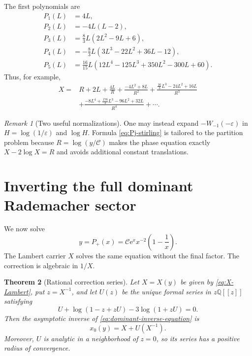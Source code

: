 \documentclass[11pt,a4paper]{article}
\numberwithin{equation}{section}
\newtheorem{theorem}{Theorem}[section]
\theoremstyle{remark}
\newtheorem{remark}[theorem]{Remark}
\newcommand{\e}{\mathrm e}
\newcommand{\QQ}{\mathbb Q}
\newcommand{\Ccal}{\mathcal C}
\begin{document}
The first polynomials are
\begin{align}
 P_1(L)&=4L,\nonumber\\
 P_2(L)&=-4L(L-2),\nonumber\\
 P_3(L)&=\frac83L(2L^2-9L+6),\label{eq:P-first}\\
 P_4(L)&=-\frac83L(3L^3-22L^2+36L-12),\nonumber\\
 P_5(L)&=\frac{16}{15}L(12L^4-125L^3+350L^2-300L+60).\nonumber
\end{align}
Thus, for example,
\begin{align}\label{eq:X-explicit-five}
 X={}&R+2L+\frac{4L}{R}
 +\frac{-4L^2+8L}{R^2}
 +\frac{\frac{16}{3}L^3-24L^2+16L}{R^3}\\
 &+\frac{-8L^4+\frac{176}{3}L^3-96L^2+32L}{R^4}
 +\cdots.\nonumber
\end{align}

\begin{remark}[Two useful normalizations]
One may instead expand $-W_{-1}(-\varepsilon)$ in
$H=\log(1/\varepsilon)$ and $\log H$.  Formula \cref{eq:Pj-stirling} is tailored to the partition problem because $R=\log(y/\Ccal)$ makes the phase equation exactly $X-2\log X=R$ and avoids additional constant translations.
\end{remark}

\section{Inverting the full dominant Rademacher sector}\label{sec:dominant-inverse}

We now solve
\begin{equation}\label{eq:dominant-inverse-equation}
 y=P_+(x)=\Ccal\e^x x^{-2}\left(1-\frac1x\right).
\end{equation}
The Lambert carrier $X$ solves the same equation without the final factor.  The correction is algebraic in $1/X$.

\begin{theorem}[Rational correction series]\label{thm:U-series}
Let $X=X(y)$ be given by \cref{eq:X-Lambert}, put $z=X^{-1}$, and let $U(z)$ be the unique formal series in $z\QQ[[z]]$ satisfying
\begin{equation}\label{eq:U-implicit}
 \boxed{U+\log(1-z+zU)-3\log(1+zU)=0.}
\end{equation}
Then the asymptotic inverse of \cref{eq:dominant-inverse-equation} is
\begin{equation}\label{eq:x0-XU}
 x_0(y)=X+U(X^{-1}).
\end{equation}
Moreover, $U$ is analytic in a neighborhood of $z=0$, so its series has a positive radius of convergence.
\end{theorem}
\end{document}
